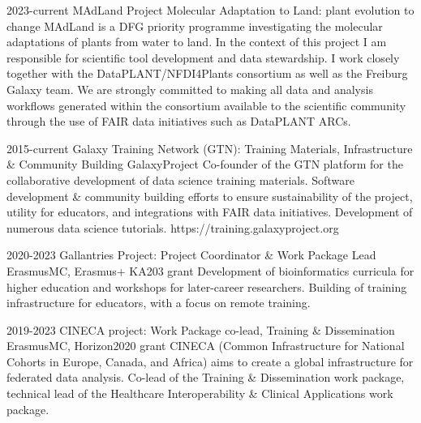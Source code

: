 \documentclass[]{shiltemann-cv}
\begin{document}
\begin{entrylist}
   \entry
    {2023-current}
    {MAdLand Project}
    {Molecular Adaptation to Land: plant evolution to change}
    {MAdLand is a DFG priority programme investigating the molecular adaptations of plants from water to land. In the context of this project I am responsible for scientific tool development and data stewardship. I work closely together with the DataPLANT/NFDI4Plants consortium as well as the Freiburg Galaxy team. We are strongly committed to making all data and analysis workflows generated within the consortium available to the scientific community through the use of FAIR data initiatives such as DataPLANT ARCs.}

\end{entrylist}

\begin{entrylist}
    \entry
    {2015-current}
    {Galaxy Training Network (GTN): Training Materials, Infrastructure \& Community Building}
    {GalaxyProject}
    {Co-founder of the GTN platform for the collaborative development of data science training materials. Software development \& community building efforts to ensure sustainability of the project, utility for educators, and integrations with FAIR data initiatives. Development of numerous data science tutorials. https://training.galaxyproject.org }
\end{entrylist}


\begin{entrylist}
   \entry
    {2020-2023}
    {Gallantries Project: Project Coordinator \& Work Package Lead}
    {ErasmusMC, Erasmus+ KA203 grant}
    {Development of bioinformatics curricula for higher education and workshops for later-career researchers. Building of training infrastructure for educators, with a focus on remote training.}
\end{entrylist}

\begin{entrylist}
   \entry
    {2019-2023}
    {CINECA project: Work Package co-lead, Training \& Dissemination}
    {ErasmusMC, Horizon2020 grant}
    {CINECA (Common Infrastructure for National Cohorts in Europe, Canada, and Africa) aims to create a global infrastructure for federated data analysis. Co-lead of the Training \& Dissemination  work package, technical lead of the Healthcare Interoperability \& Clinical Applications work package.}
 \end{entrylist}
\end{document}
